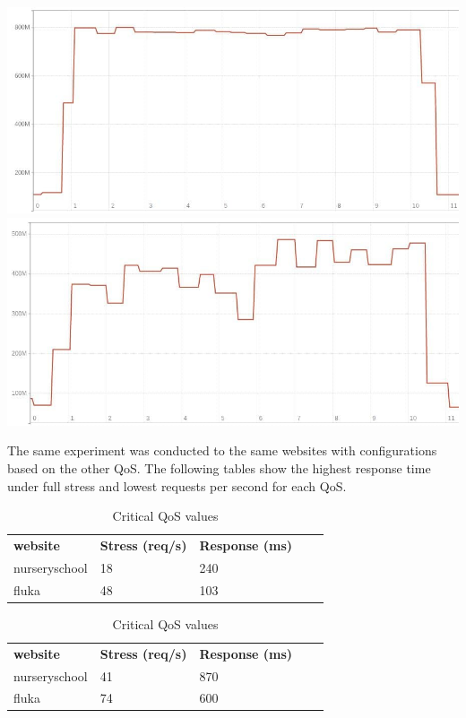 \includegraphics[width=\linewidth/2]{figures/experiment-figures/nursery_memory_usage.jpg}
\includegraphics[width=\linewidth/2]{figures/experiment-figures/fluka_memory_usage.jpg}

The same experiment was conducted to the same websites with configurations based on the other QoS. 
The following tables show the highest response time under full stress and lowest requests per second for each QoS.

\begin{table}[!htb]
\centering
\parbox{.45\linewidth}{
\begin{tabular}{|l|ll|ll}
\cline{1-3}
\textbf{website} & \multicolumn{1}{l|}{\textbf{Stress (req/s)}} & \textbf{Response (ms)} &  &  \\ \cline{1-3}
nurseryschool    & 18                                           & 240                    &  &  \\ \cline{1-1}
fluka            & 48                                           & 103                    &  &  \\ \cline{1-3}
\end{tabular}
}
\hfill
\caption{Standard QoS values}
\parbox{.45\linewidth}
{\begin{tabular}{|l|ll|ll}
\cline{1-3}
\textbf{website} & \multicolumn{1}{l|}{\textbf{Stress (req/s)}} & \textbf{Response (ms)} &  &  \\ \cline{1-3}
nurseryschool    & 41  & 870   &  &  \\ \cline{1-1}
fluka            & 74  & 600   &  &  \\ \cline{1-3}
\end{tabular}
}
\caption{ Critical QoS values}
\end{table}





